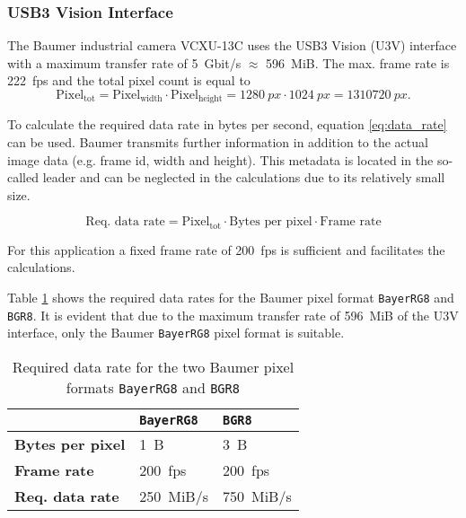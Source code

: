 \subsubsection{USB3 Vision Interface}
\label{subsubsec:usb3_vision_interface}

The Baumer industrial camera VCXU-13C uses the USB3 Vision (U3V) interface with a maximum transfer rate of \SI{5}{Gbit/s} $\approx$ \SI{596}{MiB}.
The max. frame rate is \SI{222}{fps} and the total pixel count is equal to
\[
\text{Pixel}_\text{tot} = \text{Pixel}_\text{width} \cdot \text{Pixel}_\text{height} = \SI{1280}{px} \cdot \SI{1024}{px} = \SI{1310720}{px}.
\]

To calculate the required data rate in bytes per second, equation \ref{eq:data_rate} can be used.
Baumer transmits further information in addition to the actual image data (e.g. frame id, width and height).
This metadata is located in the so-called leader and can be neglected in the calculations due to its relatively small size.

\begin{equation}
  \text{Req. data rate} = \text{Pixel}_\text{tot} \cdot \text{Bytes per pixel} \cdot \text{Frame rate}
  \label{eq:data_rate}
\end{equation}

For this application a fixed frame rate of \SI{200}{fps} is sufficient and facilitates the calculations.

Table \ref{tab:data_rates} shows the required data rates for the Baumer pixel format \texttt{BayerRG8} and \texttt{BGR8}.
It is evident that due to the maximum transfer rate of \SI{596}{MiB} of the U3V interface, only the Baumer \texttt{BayerRG8} pixel format is suitable.

\begin{table}[h]
  \caption{Required data rate for the two Baumer pixel formats \texttt{BayerRG8} and \texttt{BGR8}}
  \label{tab:data_rates}
  \centering
  \begin{tabular}{lll}
    \toprule
     & \textbf{\texttt{BayerRG8}} & \textbf{\texttt{BGR8}} \\
    \midrule
    \textbf{Bytes per pixel} & \SI{1}{B} & \SI{3}{B} \\
    \textbf{Frame rate} & \SI{200}{fps} & \SI{200}{fps} \\
    \textbf{Req. data rate} & \SI{250}{MiB/s} & \SI{750}{MiB/s} \\
    \bottomrule
  \end{tabular}
\end{table}
